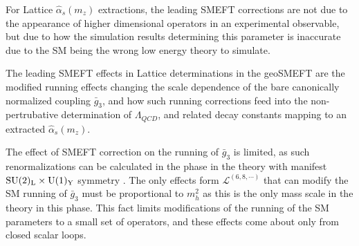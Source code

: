 \documentclass[twocolumn,nofootinbib,amsmath,amssymb,prl,aps,superscriptaddress,tightenlines,preprintnumbers]{revtex4}
\begin{document}
For Lattice $\hat{\alpha}_s(m_z)$ extractions, the leading SMEFT corrections are
not due to the appearance of higher dimensional operators in an experimental observable,
but due to how the simulation results determining this parameter is inaccurate due to the SM being the
wrong low energy theory to simulate.


The leading SMEFT effects in Lattice determinations in the geoSMEFT are
the modified running effects changing the scale dependence of
the bare canonically normalized coupling $\bar{g}_3$, and how such running corrections feed into the
non-pertrubative determination of $\Lambda_{QCD}$, and related decay constants
mapping to an extracted $\hat{\alpha}_s(m_z)$.

The effect of SMEFT correction on the running of $\bar{g}_3$ is limited, as such renormalizations can
be calculated in the phase in the theory with manifest $\rm SU(2)_L \times U(1)_Y$ symmetry \cite{tHooft:1971akt,'tHooft:1972fi,'tHooft:1975vy,tHooft:1972tcz}.
The only effects form $\mathcal{L}^{(6,8, \cdots)}$ that can modify the SM running of $\bar{g}_3$
must be proportional to $m_h^2$ as this is the only mass scale in the theory in this phase.
This fact limits modifications of the running of the SM parameters to a small set of operators, and these
effects come about only from closed scalar loops.
\end{document}

